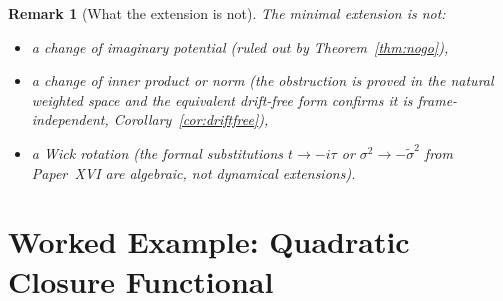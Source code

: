 \documentclass[12pt]{article}
\newtheorem{remark}[theorem]{Remark}
\begin{document}
\begin{remark}[What the extension is not]
The minimal extension is not:
\begin{itemize}
    \item a change of imaginary potential (ruled out by Theorem~\ref{thm:nogo}),
    \item a change of inner product or norm (the obstruction is proved in the natural weighted space and the equivalent drift-free form confirms it is frame-independent, Corollary~\ref{cor:driftfree}),
    \item a Wick rotation (the formal substitutions $t \to -i\tau$ or $\sigma^2 \to -\tilde{\sigma}^2$ from Paper~XVI are algebraic, not dynamical extensions).
\end{itemize}
\end{remark}

\section{Worked Example: Quadratic Closure Functional}\label{sec:example}
\end{document}
